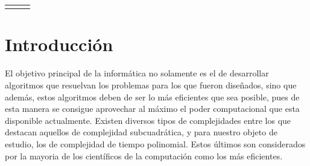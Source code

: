 \documentclass{report}
\begin{document}
\begin{center}
\begin{tabular}{l c r}
    & \bf\fontsize{22}{0}{\selectfont{ Escuela Superior de C\'omputo}} &  \\
    \end{tabular}

	
	\vspace*{2\baselineskip}
	
	{
		\bf\fontsize{12}{0}{\selectfont{An\'alisis de Algoritmos, Sem: 2021-1, 3CV1, Pr\'actica 3, 09/11/20}}
	}
			
	\vspace*{2\baselineskip}
			 
	{
		\fontsize{23}{0}{\selectfont{Práctica 3: Complejidades temporales polinomiales y no polinomiales}}
	}
	
	\vspace*{2\baselineskip}
	
	{
		\bf\fontsize{12}{0}{\selectfont{Valle Mart\'inez Luis Eduardo, Rivero Ronquillo Omar Imanol}}
	}
	
	\vspace*{1\baselineskip}
	
	{
	}
	
	\vspace*{2\baselineskip}

    {
	    \fontsize{12}{0}
	    
	    \fontsize{12}{0}
	
	}
\end{center}

\hfill \break
\hfill \break
\hfill \break

\section*{Introducción} 
    El objetivo principal de la informática no solamente es el de desarrollar algoritmos que resuelvan los problemas para los que fueron diseñados, sino que además, estos algoritmos deben de ser lo más eficientes que sea posible, pues de esta manera se consigue aprovechar al máximo el poder computacional que esta disponible actualmente. Existen diversos tipos de complejidades entre los que destacan aquellos de complejidad subcuadrática, y para nuestro objeto de estudio, los de complejidad de tiempo polinomial. Estos últimos son considerados por la mayoria de los científicos de la computación como los más eficientes.
\newpage
\end{document}
